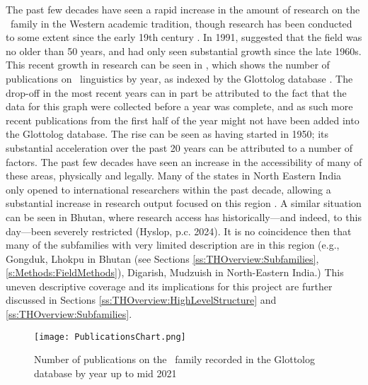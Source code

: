 The past few decades have seen a rapid increase in the amount of research on the \lfam\ family in the Western academic tradition, though research has been conducted to some extent since the early 19th century \cite{VanDriem2014}. In 1991,  suggested that the field was no older than 50 years, and had only seen substantial growth since the late 1960s. This recent growth in research can be seen in , which shows the number of publications on \lfam\ linguistics by year, as indexed by the Glottolog database \cite{glottolog}. The drop-off in the most recent years can in part be attributed to the fact that the data for this graph were collected before a year was complete, and as such more recent publications from the first half of the year might not have been added into the Glottolog database. The rise can be seen as having started in 1950; its substantial acceleration over the past 20 years can be attributed to a number of factors. The past few decades have seen an increase in the accessibility of many of these areas, physically and legally. Many of the states in North Eastern India only opened to international researchers within the past decade, allowing a substantial increase in research output focused on this region \cite{BlenchPost2014}. A similar situation can be seen in Bhutan, where research access has historically---and indeed, to this day---been severely restricted (Hyslop, p.c. 2024). It is no coincidence then that many of the subfamilies with very limited description are in this region (e.g., Gongduk, Lhokpu in Bhutan (see Sections \ref{ss:THOverview:Subfamilies}, \ref{s:Methods:FieldMethods}), Digarish, Mudzuish in North-Eastern India.) This uneven descriptive coverage and its implications for this project are further discussed in Sections \ref{ss:THOverview:HighLevelStructure} and \ref{ss:THOverview:Subfamilies}.


\begin{figure}

\centering
\texttt{[image: PublicationsChart.png]}
\caption{Number of publications on the \lfam\ family recorded in the Glottolog database by year up to mid 2021 \cite{glottolog}}
\label{fig:PublicationsChart}
\end{figure}


